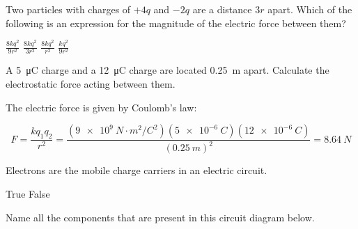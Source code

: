 \documentclass[answers]{exam}
\begin{document}
\begin{questions}
\question
Two particles with charges of $+4q$ and $-2q$ are a distance $3r$ apart. Which of the following is an expression for the magnitude of the electric force between them?

\begin{randomizeoneparchoices}
    \correctchoice $\displaystyle \frac{8kq^2}{9r^2}$
    \choice $\displaystyle \frac{8kq^2}{3r^2}$
    \choice $\displaystyle \frac{8kq^2}{r^2}$
    \choice $\displaystyle \frac{kq^2}{9r^2}$
\end{randomizeoneparchoices}

\question
A \SI{5}{\micro\coulomb} charge and a \SI{12}{\micro\coulomb} charge are located \SI{0.25}{m} apart. Calculate the electrostatic force acting between them.

\begin{solutionorbox}[4cm]
The electric force is given by Coulomb's law:

\begin{equation*}
    F = \frac{kq_1q_2}{r^2} = \frac{\left(\SI{9e9}{N\cdot m^2/C^2}\right)(\SI{5e-6}{C})(\SI{12e-6}{C})}{(\SI{0.25}{m})^2} = \SI{8.64}{N}
\end{equation*}
\end{solutionorbox}


\clearpage


\question
Electrons are the mobile charge carriers in an electric circuit.

\begin{randomizechoices}[norandomize]
    \correctchoice True
    \choice False
\end{randomizechoices}

\question
Name all the components that are present in this circuit diagram below.
\bigskip


\begin{center}
\end{center}


\end{questions}
\end{document}
